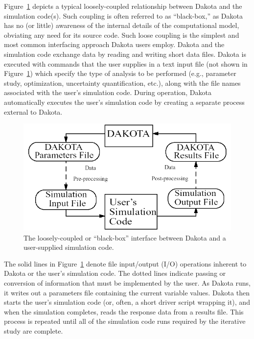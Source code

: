 Figure~\ref{intro:bbinterface} depicts a typical loosely-coupled
relationship between Dakota and the simulation code(s).  Such coupling
is often referred to as ``black-box,'' as Dakota has no (or little)
awareness of the internal details of the computational model,
obviating any need for its source code.  Such loose coupling is the
simplest and most common interfacing approach Dakota users
employ. Dakota and the simulation code exchange data by reading and
writing short data files. Dakota is executed with commands that the
user supplies in a text input file (not shown in
Figure~\ref{intro:bbinterface}) which specify the type of analysis to
be performed (e.g., parameter study, optimization, uncertainty
quantification, etc.), along with the file names associated with the
user's simulation code. During operation, Dakota automatically
executes the user's simulation code by creating a separate process
external to Dakota.

\begin{figure}
  \centering
  \includegraphics[scale=0.60]{images/dakota_flowchart}
  \caption{The loosely-coupled or ``black-box'' interface between
    Dakota and a user-supplied simulation code.}
  \label{intro:bbinterface}
\end{figure}

The solid lines in Figure~\ref{intro:bbinterface} denote file
input/output (I/O) operations inherent to Dakota or the user's
simulation code. The dotted lines indicate passing or conversion of
information that must be implemented by the user. As Dakota runs, it
writes out a parameters file containing the current variable values.
Dakota then starts the user's simulation code (or, often, a short
driver script wrapping it), and when the simulation completes, reads
the response data from a results file. This process is repeated until
all of the simulation code runs required by the iterative study are
complete.

